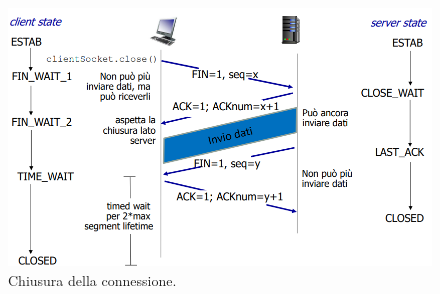 \documentclass[11pt, italian, openany]{book}
\begin{document}
\begin{sloppypar}
\pagebreak

\begin{figure}[!h]
	\centering
	\includegraphics[scale=0.45]{images/tcp-chiusura.png}
	\caption{Chiusura della connessione.}
	\label{fig:tcp-chiusura}
\end{figure}

\end{sloppypar}
\end{document}
